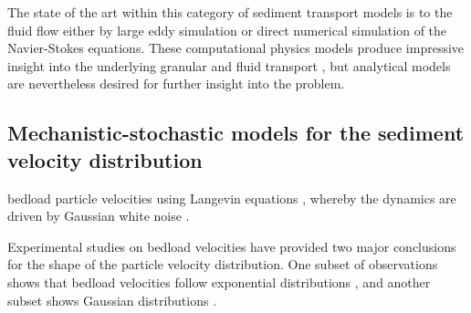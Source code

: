 The state of the art within this category of sediment transport models is to \DIFdelbegin {}\DIFdelend \DIFaddbegin {}\DIFaddend the fluid flow \DIFdelbegin {}\DIFdelend \DIFaddbegin {}\DIFaddend either by large eddy simulation or direct numerical simulation of the Navier-Stokes equations\DIFdelbegin {}\DIFdelend \DIFaddbegin {}\DIFaddend .
These computational physics models produce impressive insight into the underlying granular and fluid \DIFdelbegin {}\DIFdelend \DIFaddbegin {}\DIFaddend transport \citep{Frey2011}, but analytical models are nevertheless desired for further insight into the problem.

\subsection{Mechanistic-stochastic models for the sediment velocity distribution}
\label{sec:langevin}

\DIFdelbegin {}\DIFdelend \DIFaddbegin {}\DIFaddend bedload particle velocities \DIFaddbegin {}\DIFaddend using Langevin equations \citep{Ancey2014,Fan2014}, whereby the \DIFdelbegin {}\DIFdelend \DIFaddbegin {}\DIFaddend dynamics are driven by Gaussian white noise \citep{Kubo1978}.

Experimental studies on bedload velocities have provided two major conclusions for the shape of the particle velocity distribution. One subset of observations shows that bedload velocities follow exponential distributions \citep{Lajeunesse2010,Furbish2012,Fathel2015}, and another subset shows Gaussian distributions \citep{Martin2012,Ancey2014,Heyman2016}.

